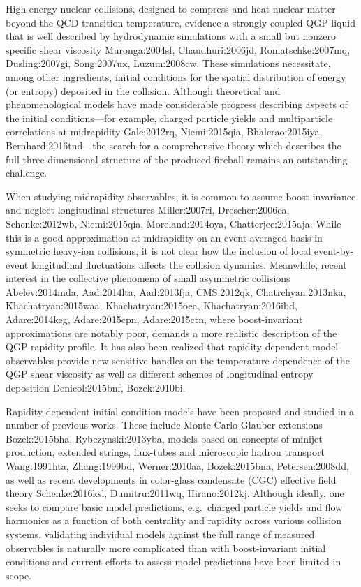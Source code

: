 High energy nuclear collisions, designed to compress and heat nuclear matter beyond the QCD transition temperature, evidence a strongly coupled QGP liquid that is well described by hydrodynamic simulations with a small but nonzero specific shear viscosity {Muronga:2004sf, Chaudhuri:2006jd, Romatschke:2007mq, Dusling:2007gi, Song:2007ux, Luzum:2008cw}.
These simulations necessitate, among other ingredients, initial conditions for the spatial distribution of energy (or entropy) deposited in the collision.
Although theoretical and phenomenological models have made considerable progress describing aspects of the initial conditions---for example, charged particle yields and multiparticle correlations at midrapidity {Gale:2012rq, Niemi:2015qia, Bhalerao:2015iya, Bernhard:2016tnd}---the search for a comprehensive theory which describes the full three-dimensional structure of the produced fireball remains an outstanding challenge.

When studying midrapidity observables, it is common to assume boost invariance and neglect longitudinal structures {Miller:2007ri, Drescher:2006ca, Schenke:2012wb, Niemi:2015qia, Moreland:2014oya, Chatterjee:2015aja}.
While this is a good approximation at midrapidity on an event-averaged basis in symmetric heavy-ion collisions, it is not clear how the inclusion of local event-by-event longitudinal fluctuations affects the collision dynamics.
Meanwhile, recent interest in the collective phenomena of small asymmetric collisions {Abelev:2014mda, Aad:2014lta, Aad:2013fja, CMS:2012qk, Chatrchyan:2013nka, Khachatryan:2015waa, Khachatryan:2015oea, Khachatryan:2016ibd, Adare:2014keg, Adare:2015cpn, Adare:2015ctn}, where boost-invariant approximations are notably poor, demands a more realistic description of the QGP rapidity profile.
It has also been realized that rapidity dependent model observables provide new sensitive handles on the temperature dependence of the QGP shear viscosity as well as different schemes of longitudinal entropy deposition {Denicol:2015bnf, Bozek:2010bi}.

Rapidity dependent initial condition models have been proposed and studied in a number of previous works. 
These include Monte Carlo Glauber extensions {Bozek:2015bha, Rybczynski:2013yba}, models based on concepts of minijet production, extended strings, flux-tubes and microscopic hadron transport {Wang:1991hta, Zhang:1999bd, Werner:2010aa, Bozek:2015bna, Petersen:2008dd}, as well as recent developments in color-glass condensate (CGC) effective field theory {Schenke:2016ksl, Dumitru:2011wq, Hirano:2012kj}.
Although ideally, one seeks to compare basic model predictions, e.g.\ charged particle yields and flow harmonics as a function of both centrality and rapidity across various collision systems, validating individual models against the full range of measured observables is naturally more complicated than with boost-invariant initial conditions and current efforts to assess model predictions have been limited in scope.

